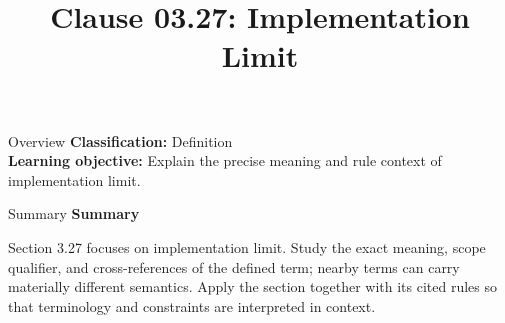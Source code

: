\documentclass[10pt,letterpaper]{article}
\title{Clause 03.27: Implementation Limit}
\author{}
\date{}
\begin{document}
\maketitle
\begin{CornellOverviewBox}{Overview}
\textbf{Classification:} Definition\\[2pt]
\textbf{Learning objective:} Explain the precise meaning and rule context of implementation limit.
\end{CornellOverviewBox}\begin{CornellSummaryBox}{Summary}
{\sffamily\bfseries\color{Accent} Summary}\par\vspace{3pt}Section 3.27 focuses on implementation limit. Study the exact meaning, scope qualifier, and cross-references of the defined term; nearby terms can carry materially different semantics. Apply the section together with its cited rules so that terminology and constraints are interpreted in context.
\end{CornellSummaryBox}
\end{document}
